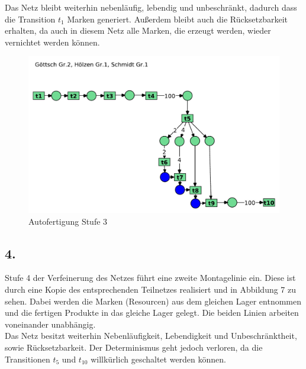 \documentclass[12pt, paper=a4]{article}
\begin{document}
Das Netz bleibt weiterhin nebenläufig, lebendig und unbeschränkt, dadurch dass die Transition $t_1$ Marken generiert. Außerdem bleibt auch die Rücksetzbarkeit erhalten, da auch in diesem Netz alle Marken, die erzeugt werden, wieder vernichtet werden können.\\

\begin{figure}[h!]
\centering
\includegraphics[scale=0.7]{7-5-3.pdf}
\caption{Autofertigung Stufe 3}
\end{figure}

\newpage
\subsection*{4.}
Stufe 4 der Verfeinerung des Netzes führt eine zweite Montagelinie ein. Diese ist durch eine Kopie des entsprechenden Teilnetzes realisiert und in Abbildung 7 zu sehen. Dabei werden die Marken (Resourcen) aus dem gleichen Lager entnommen und die fertigen Produkte in das gleiche Lager gelegt. Die beiden Linien arbeiten voneinander unabhängig.\\

Das Netz besitzt weiterhin Nebenläufigkeit, Lebendigkeit und Unbeschränktheit, sowie Rücksetzbarkeit. Der Determinismus geht jedoch verloren, da die Transitionen $t_5$ und $t_10$ willkürlich geschaltet werden können.\\
\end{document}
